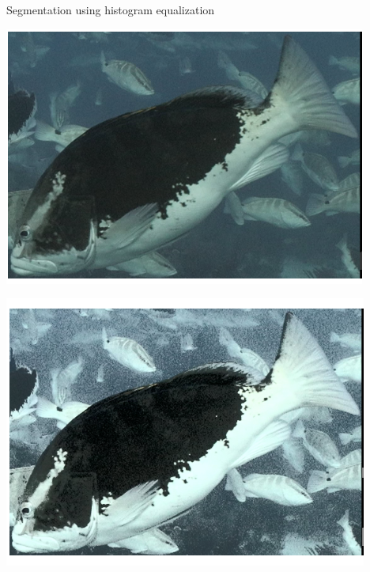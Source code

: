 


\begin{frame}{Segmentation using histogram equalization}
    \begin{minipage}{0.5\textwidth}
        \centering
        \includegraphics[height=0.7\textheight,keepaspectratio]{images/gm4-1.png}
    \end{minipage}%
    \begin{minipage}{0.5\textwidth}
        \centering
        \includegraphics[height=0.7\textheight,keepaspectratio]{images/gm4-2.png}
    \end{minipage}
\end{frame}


